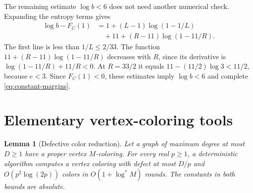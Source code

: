 \documentclass[11pt]{article}
\newtheorem{lemma}[theorem]{Lemma}
\theoremstyle{definition}
\theoremstyle{remark}
\begin{document}
The remaining estimate $\log b<6$ does not need another numerical check.
Expanding the entropy terms gives
\begin{align*}
 \log b-F_C(1)
 &=1+(L-1)\log(1-1/L)\\
 &\quad+11+(R-11)\log(1-11/R).
\end{align*}
The first line is less than $1/L\le2/33$.
The function $11+(R-11)\log(1-11/R)$ decreases with $R$, since its
derivative is $\log(1-11/R)+11/R<0$.  At $R=33/2$ it equals
$11-(11/2)\log3<11/2$, because $e<3$.
Since $F_C(1)<0$, these estimates imply $\log b<6$ and complete
\eqref{eq:constant-margins}.


\section{Elementary vertex-coloring tools}\label{app:defective}
\begin{lemma}[Defective color reduction]\label{lem:defective-elementary}
Let a graph of maximum degree at most $D\ge1$ have a proper vertex
$M$-coloring.  For every real $p\ge1$, a deterministic algorithm computes
a vertex coloring with defect at most $D/p$ and
$O(p^2\log(2p))$ colors in $O(1+\log^* M)$ rounds.
The constants in both bounds are absolute.
\end{lemma}
\end{document}
